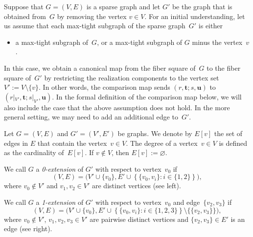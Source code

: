 \documentclass[12pt]{article}
\theoremstyle{definition}
\newtheorem{remark}[lemma]{Remark}
\newenvironment{Mlist}{\begin{itemize}[topsep=0pt,itemsep=0pt,leftmargin=7mm]}{\end{itemize}}
\newcommand{\END}{\hfill $\vartriangleleft$}
\newcommand{\df}[1]{{\it #1}}
\newcommand{\set}[2]{\left\{#1:#2\right\}}
\newcommand{\bt}{\mathbf{t}}
\newcommand{\bu}{\mathbf{u}}
\begin{document}
Suppose that $G=(V,E)$ is a sparse graph
and let $G'$ be the graph that is obtained from~$G$ by removing the vertex $v\in V$.
For an initial understanding,
let us assume that each max-tight subgraph of the sparse graph~$G'$ is
either
\begin{Mlist}
\item a max-tight subgraph of~$G$, or a max-tight subgraph of $G$ minus the vertex~$v$.
\end{Mlist}
In this case, we obtain a canonical map from
the fiber square of~$G$ to the fiber square of~$G'$ by restricting
the realization components to the vertex set~$V':=V\setminus\{v\}$.
In other words, the comparison map sends $(r,\bt;s,\bu)$ to $(r|_{V'},\bt;s|_{V'},\bu)$.
In the formal definition of the comparison map below,
we will also include the case that the above assumption does not hold.
In the more general setting, we may need to add an additional edge to~$G'$.

Let $G=(V,E)$ and $G'=(V',E')$ be graphs.
We denote by $E[v]$ the set of edges in $E$ that contain the vertex~$v\in V$.
The degree of a vertex~$v\in V$ is defined as the cardinality of~$E[v]$.
If $v\notin V$, then $E[v]:=\varnothing$.

We call $G$ a \df{0-extension} of $G'$ with respect to vertex~$v_0$ if
\[
(V,E)=\bigl(V'\cup\{v_0\},E'\cup\set{\{v_0,v_i\}}{i\in\{1,2\}}),
\]
where $v_0\notin V'$ and $v_1,v_2\in V'$ are distinct vertices (see  left).

We call $G$ a \df{1-extension} of $G'$ with respect to vertex~$v_0$ and edge~$\{v_2,v_3\}$
if
\[
(V,E)=\bigl(V'\cup\{v_0\},E'\cup\set{\{v_0,v_i\}}{i\in\{1,2,3\}}\setminus\{\{v_2,v_3\}\}\bigr),
\]
where $v_0\notin V'$, $v_1,v_2,v_3\in V'$ are pairwise distinct vertices and $\{v_2,v_3\}\in E'$ is an edge (see  right).
\end{document}
